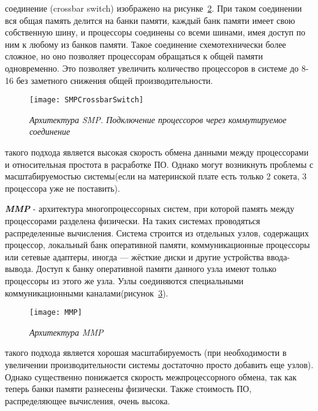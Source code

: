 {\begin{itemize}
\begin{figure}[H]
					\label{SMPSystemBus:image}
				\end{figure}
			 соединение (crossbar switch) изображено на рисунке~\ref{SMPCrossbarSwitch:image}. При таком соединении вся общая память делится на банки памяти, каждый банк памяти имеет свою собственную шину, и процессоры соединены со всеми шинами, имея доступ по ним к любому из банков памяти. Такое соединение схемотехнически более сложное, но оно позволяет процессорам обращаться к общей памяти одновременно. Это позволяет увеличить количество процессоров в системе до 8-16 без заметного снижения общей производительности.
				\begin{figure}[H]
					\texttt{[image: SMPCrossbarSwitch]}
					\caption{\textit{Архитектура SMP. Подключение процессоров через коммутируемое соединение}}
					\label{SMPCrossbarSwitch:image}
				\end{figure}
		\end{itemize}
	 такого подхода является высокая скорость обмена данными между процессорами и относительная простота в расработке ПО. Однако могут возникнуть проблемы с масштабируемостью системы(если на материнской плате есть только 2 сокета, 3 процессора уже не поставить).
	\par\textbf{\textit{MMP}} - архитектура многопроцессорных систем, при которой память между процессорами разделена физически. На таких системах проводяться распределенные вычисления. Система строится из отдельных узлов, содержащих процессор, локальный банк оперативной памяти, коммуникационные процессоры или сетевые адаптеры, иногда — жёсткие диски и другие устройства ввода-вывода. Доступ к банку оперативной памяти данного узла имеют только процессоры из этого же узла. Узлы соединяются специальными коммуникационными каналами(рисунок~\ref{MMP:image}).
		\begin{figure}[H]
			\texttt{[image: MMP]}
			\caption{\textit{Архитектура MMP}}
			\label{MMP:image}
		\end{figure}
	 такого подхода является хорошая масштабируемость (при необходимости в увеличении производительности системы достаточно просто добавить еще узлов). Однако существенно понижается скорость межпроцессорного обмена, так как теперь банки памяти разнесены физически. Также стоимость ПО, распределяющее вычисления, очень высока.
	\par
}